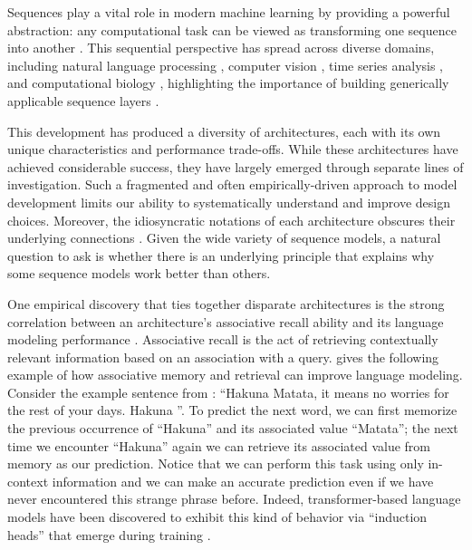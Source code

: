 \documentclass[notitlepage, 11pt]{article}
\begin{document}
Sequences play a vital role in modern machine learning by providing a powerful abstraction: any computational task can be viewed as transforming one sequence into another \citep{Sutskever2014SequenceSequenceLearning}.
This sequential perspective has spread across diverse domains, including natural language processing  \citep{Sutskever2014SequenceSequenceLearning,Devlin2019BERTPretrainingDeep,Brown2020LanguageModelsAre}, computer vision \citep{Dosovitskiy2021ImageWorth16x16,Bertasius2021SpaceTimeAttentionAll}, time series analysis \citep{Salinas2020DeepARProbabilisticForecasting,Gruver2023LargeLanguageModels,Ansari2024ChronosLearningLanguage}, and computational biology \citep{Jumper2021HighlyAccurateProtein,Zhou2015PredictingEffectsNoncoding,Nguyen2024SequenceModelingDesign}, highlighting the importance of building generically applicable sequence layers \citep{Vaswani2017AttentionAllYou}.



This development has produced a diversity of architectures, each with its own unique characteristics and performance trade-offs.
While these architectures have achieved considerable success, they have largely emerged through separate lines of investigation.
Such a fragmented and often empirically-driven approach to model development limits our ability to systematically understand and improve design choices.
Moreover, the idiosyncratic notations of each architecture obscures their underlying connections \citep{SashaRush2024ThereAre4}.
Given the wide variety of sequence models, a natural question to ask is whether there is an underlying principle that explains why some sequence models work better than others.

One empirical discovery that ties together disparate architectures is the strong correlation between an architecture's associative recall ability and its language modeling performance \citep{Olsson2022ContextLearningInduction,Arora2023ZoologyMeasuringImproving}.
Associative recall is the act of retrieving contextually relevant information based on an association with a query.
\citep{Arora2023ZoologyMeasuringImproving} gives the following example of how associative memory and retrieval can improve language modeling.
Consider the example sentence from \citet{Arora2023LanguageModelsEnable}: ``Hakuna Matata, it means no worries for the rest of your days. Hakuna \underline{\hspace{1cm}} ''.
To predict the next word, we can first memorize the previous occurrence of ``Hakuna'' and its associated value ``Matata''; the next time we encounter ``Hakuna'' again we can retrieve its associated value from memory as our prediction.
Notice that we can perform this task using only in-context information and we can make an accurate prediction even if we have never encountered this strange phrase before.
Indeed, transformer-based language models have been discovered to exhibit this kind of behavior via ``induction heads'' that emerge during training \citep{Olsson2022ContextLearningInduction}.
\end{document}
